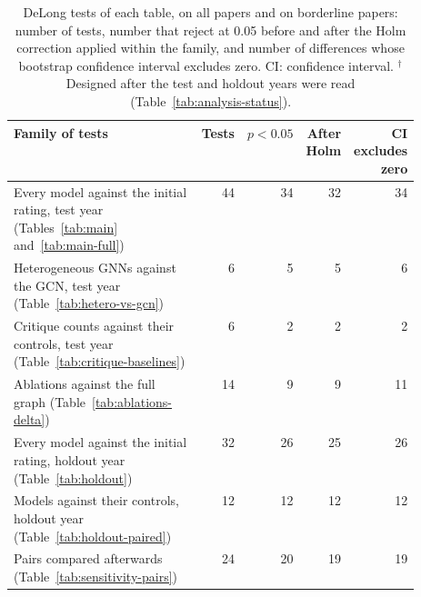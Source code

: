 \begin{table}[t]
\centering
\footnotesize
\setlength{\tabcolsep}{4pt}
\caption{DeLong tests of each table, on all papers and on borderline papers: number of tests, number that reject at 0.05 before and after the Holm correction applied within the family, and number of differences whose bootstrap confidence interval excludes zero. CI: confidence interval. $^{\dagger}$Designed after the test and holdout years were read (Table~\ref{tab:analysis-status}).}
\label{tab:holm}
\begin{tabular}{@{}>{\raggedright\arraybackslash}p{0.52\linewidth}rrrr@{}}
\toprule
Family of tests & Tests & $p < 0.05$ & After Holm & CI excludes zero \\
\midrule
Every model against the initial rating, test year (Tables~\ref{tab:main} and~\ref{tab:main-full}) & 44 & 34 & 32 & 34 \\
Heterogeneous GNNs against the GCN, test year (Table~\ref{tab:hetero-vs-gcn}) & 6 & 5 & 5 & 6 \\
Critique counts against their controls, test year (Table~\ref{tab:critique-baselines}) & 6 & 2 & 2 & 2 \\
Ablations against the full graph (Table~\ref{tab:ablations-delta}) & 14 & 9 & 9 & 11 \\
Every model against the initial rating, holdout year (Table~\ref{tab:holdout}) & 32 & 26 & 25 & 26 \\
Models against their controls, holdout year (Table~\ref{tab:holdout-paired}) & 12 & 12 & 12 & 12 \\
Pairs compared afterwards (Table~\ref{tab:sensitivity-pairs}) & 24 & 20 & 19 & 19 \\
\bottomrule
\end{tabular}
\end{table}
